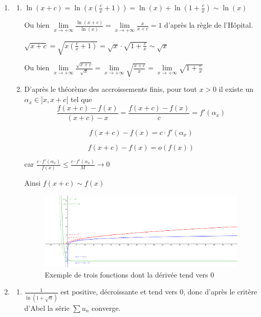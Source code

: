 \documentclass[]{article}
\begin{document}
\begin{enumerate}
\begin{enumerate}
\end{enumerate}

\item
\begin{enumerate}
	\item $\ln(x+c)=\ln\left(x\left(\frac{c}{x}+1\right)\right)=\ln(x)+\ln\left(1+\frac{c}{x}\right) \sim \ln(x)$
	
	Ou bien $\lim\limits_{x \to +\infty} \frac{\ln(x+c)}{\ln(x)}=\lim\limits_{x \to +\infty} \frac{x}{x+c}=1$ d'après la règle de l'Hôpital.
	
	$\sqrt{x+c}=\sqrt{x\left(\frac{c}{x}+1\right)}=\sqrt{x} \cdot \sqrt{1+\frac{c}{x}} \sim \sqrt{x}$
	
	Ou bien $\lim\limits_{x \to +\infty} \frac{\sqrt{x+c}}{\sqrt{x}}=\lim\limits_{x \to +\infty} \sqrt{\frac{x+c}{x}}=\lim\limits_{x \to +\infty} \sqrt{1+\frac{c}{x}}$
	
	\item D'après le théorème des accroissements finis, pour tout $x > 0$ il existe un $\alpha_x \in ]x, x+c[$ tel que $$\frac{f(x+c)-f(x)}{(x+c)-x}=\frac{f(x+c)-f(x)}{c}=f'(\alpha_x)$$
	
	$$f(x+c)-f(x)=c \cdot f'(\alpha_x)$$

	$$f(x+c)-f(x)= o(f(x))$$
	
	car $\frac{c \cdot f'(\alpha_x)}{f(x)} \leqslant \frac{c \cdot f'(\alpha_x)}{M} \longrightarrow 0$
	
	Ainsi $f(x+c) \sim f(x)$
	
	\begin{figure}[!h]
		\includegraphics[width=350pt]{Images/DeriveNulle}
		\caption{Exemple de trois fonctions dont la dérivée tend vers 0}
	\end{figure}
\end{enumerate}

\newpage

\item
\begin{enumerate}
	\item $\frac{1}{\ln(1+\sqrt{n})}$ est positive, décroissante et tend vers $0$, donc d'après le critère d'Abel la série $\sum u_n$ converge.
	

\end{enumerate}
\end{enumerate}
\end{document}
